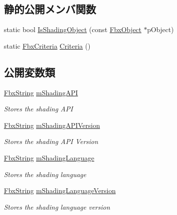 \subsection*{静的公開メンバ関数}
\begin{DoxyCompactItemize}
\item 
static bool \hyperlink{class_fbx_implementation_filter_a3109594701842272e84f683f696d8e4b}{Is\+Shading\+Object} (const \hyperlink{class_fbx_object}{Fbx\+Object} $\ast$p\+Object)
\item 
static \hyperlink{class_fbx_criteria}{Fbx\+Criteria} \hyperlink{class_fbx_implementation_filter_a343590c07f9897b9cf8ceed11b979491}{Criteria} ()
\end{DoxyCompactItemize}
\subsection*{公開変数類}
\begin{DoxyCompactItemize}
\item 
\hyperlink{class_fbx_string}{Fbx\+String} \hyperlink{class_fbx_implementation_filter_afc2611e4f45d48ce02a04f98b7d84879}{m\+Shading\+A\+PI}
\begin{DoxyCompactList}\small\item\em Stores the shading A\+PI \end{DoxyCompactList}\item 
\hyperlink{class_fbx_string}{Fbx\+String} \hyperlink{class_fbx_implementation_filter_a7465e8dd2f78fe732b44c6f4d9d4c82d}{m\+Shading\+A\+P\+I\+Version}
\begin{DoxyCompactList}\small\item\em Stores the shading A\+PI Version \end{DoxyCompactList}\item 
\hyperlink{class_fbx_string}{Fbx\+String} \hyperlink{class_fbx_implementation_filter_a31657bd12d08884c56fc09d04a0e6843}{m\+Shading\+Language}
\begin{DoxyCompactList}\small\item\em Stores the shading language \end{DoxyCompactList}\item 
\hyperlink{class_fbx_string}{Fbx\+String} \hyperlink{class_fbx_implementation_filter_a4dd713756b9a134ef2a43dcf6cb2ae59}{m\+Shading\+Language\+Version}
\begin{DoxyCompactList}\small\item\em Stores the shading language version \end{DoxyCompactList}\end{DoxyCompactItemize}
